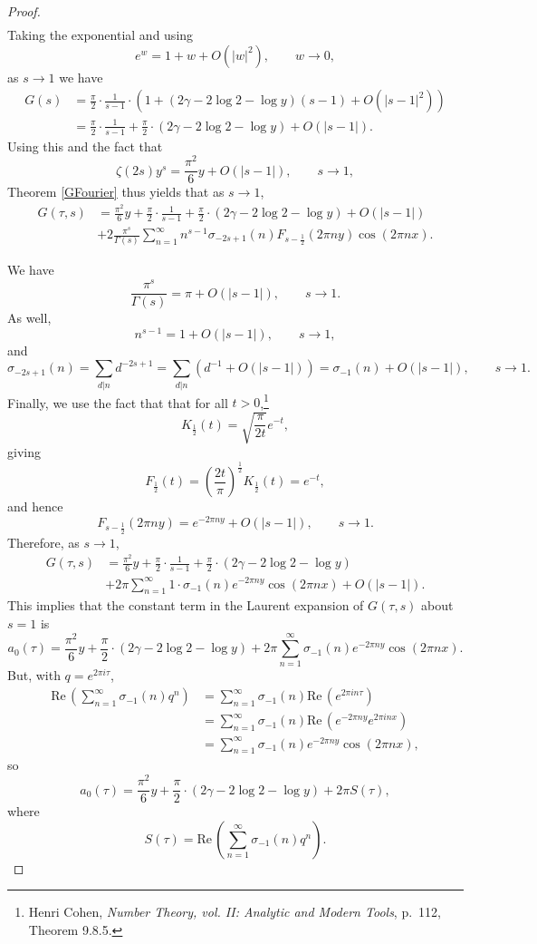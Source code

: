 \documentclass{article}
\def\Re{\ensuremath{\mathrm{Re}}\,}
\theoremstyle{definition}
\begin{document}
\begin{proof}
\begin{align*}
\end{align*}
Taking the exponential and using
\[
e^w = 1+w+O(|w|^2), \qquad w \to 0,
\]
 as $s \to 1$ we have
\begin{align*}
G(s)&=\frac{\pi}{2} \cdot \frac{1}{s-1} \cdot \left(1+(2\gamma-2\log 2-\log y)(s-1)+O(|s-1|^2)\right)\\
&=\frac{\pi}{2} \cdot \frac{1}{s-1} + \frac{\pi}{2}\cdot (2\gamma-2\log 2-\log y)+O(|s-1|).
\end{align*}
Using this and the fact that
\[
\zeta(2s)y^s = \frac{\pi^2}{6}y + O(|s-1|), \qquad s \to 1,
\]
Theorem \ref{GFourier}  thus yields that as $s \to 1$,
\begin{align*}
G(\tau,s)&=\frac{\pi^2}{6}y+\frac{\pi}{2} \cdot \frac{1}{s-1} + \frac{\pi}{2}\cdot (2\gamma-2\log 2-\log y)+O(|s-1|)\\
&+2\frac{\pi^s}{\Gamma(s)} \sum_{n=1}^\infty n^{s-1} \sigma_{-2s+1}(n) F_{s-\frac{1}{2}}(2\pi ny) \cos(2\pi nx).
\end{align*}

We have
\[
\frac{\pi^s}{\Gamma(s)} = \pi + O(|s-1|), \qquad s \to 1.
\]
As well,
\[
n^{s-1} = 1 +O(|s-1|), \qquad s \to 1,
\]
and 
\[
\sigma_{-2s+1}(n) = \sum_{d|n} d^{-2s+1} = \sum_{d|n} (d^{-1}+O(|s-1|))
=\sigma_{-1}(n) + O(|s-1|), \qquad s \to 1.
\]
Finally,
we use the fact that
that for all $t>0$,\footnote{Henri Cohen, {\em Number Theory, vol. II: Analytic and Modern Tools}, p.~112, Theorem 9.8.5.}
\[
K_{\frac{1}{2}}(t) = \sqrt{\frac{\pi}{2t}} e^{-t},
\]
giving
\[
F_{\frac{1}{2}}(t)=\left(\frac{2t}{\pi}\right)^{\frac{1}{2}} K_{\frac{1}{2}}(t) =  e^{-t},
\]
and hence
\[
F_{s-\frac{1}{2}}(2\pi ny)= e^{-2\pi ny}+O(|s-1|), \qquad s \to 1.
\]
Therefore, as $s \to 1$,
\begin{align*}
G(\tau,s)&=\frac{\pi^2}{6}y+\frac{\pi}{2} \cdot \frac{1}{s-1} + \frac{\pi}{2}\cdot (2\gamma-2\log 2-\log y)\\
&+2\pi \sum_{n=1}^\infty  1\cdot \sigma_{-1}(n) e^{-2\pi ny} \cos(2\pi nx)
+O(|s-1|).
\end{align*}
This implies that the constant term in the Laurent expansion of $G(\tau,s)$ about $s=1$ is
\[
a_0(\tau) = \frac{\pi^2}{6}y + \frac{\pi}{2}\cdot(2\gamma-2\log 2-\log y)
+2\pi \sum_{n=1}^\infty \sigma_{-1}(n) e^{-2\pi ny} \cos(2\pi nx).
\]
But, with $q=e^{2\pi i\tau}$,
\begin{align*}
\Re\left( \sum_{n=1}^\infty \sigma_{-1}(n) q^n \right)& = 
\sum_{n=1}^\infty \sigma_{-1}(n) \Re(e^{2\pi in\tau})\\
&=\sum_{n=1}^\infty \sigma_{-1}(n) \Re(e^{-2\pi ny} e^{2\pi inx})\\
&=\sum_{n=1}^\infty \sigma_{-1}(n) e^{-2\pi ny} \cos(2\pi nx),
\end{align*}
so
\[
a_0(\tau) =  \frac{\pi^2}{6}y + \frac{\pi}{2}\cdot(2\gamma-2\log 2-\log y)
+2\pi S(\tau),
\]
where
\[
S(\tau) = \Re\left( \sum_{n=1}^\infty \sigma_{-1}(n) q^n \right).
\]


\end{proof}
\end{document}
